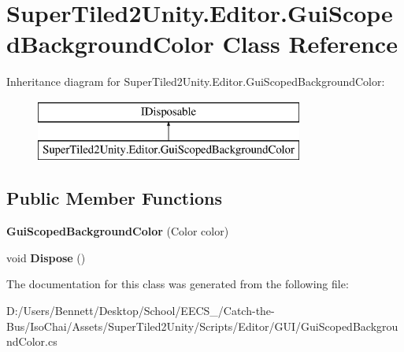 \hypertarget{class_super_tiled2_unity_1_1_editor_1_1_gui_scoped_background_color}{}\section{Super\+Tiled2\+Unity.\+Editor.\+Gui\+Scoped\+Background\+Color Class Reference}
\label{class_super_tiled2_unity_1_1_editor_1_1_gui_scoped_background_color}
Inheritance diagram for Super\+Tiled2\+Unity.\+Editor.\+Gui\+Scoped\+Background\+Color\+:\begin{figure}[H]
\begin{center}
\leavevmode
\includegraphics[height=2.000000cm]{class_super_tiled2_unity_1_1_editor_1_1_gui_scoped_background_color}
\end{center}
\end{figure}
\subsection*{Public Member Functions}
\begin{DoxyCompactItemize}
\item 
\mbox{\label{class_super_tiled2_unity_1_1_editor_1_1_gui_scoped_background_color_ae629fdef1170594b6bc5a016e02e46f0}} 
{\bfseries Gui\+Scoped\+Background\+Color} (Color color)
\item 
\mbox{\label{class_super_tiled2_unity_1_1_editor_1_1_gui_scoped_background_color_abd13eef57e5bb124b0995c5b2bae6a37}} 
void {\bfseries Dispose} ()
\end{DoxyCompactItemize}


The documentation for this class was generated from the following file\+:\begin{DoxyCompactItemize}
\item 
D\+:/\+Users/\+Bennett/\+Desktop/\+School/\+E\+E\+C\+S\+\_/\+Catch-\/the-\/\+Bus/\+Iso\+Chai/\+Assets/\+Super\+Tiled2\+Unity/\+Scripts/\+Editor/\+G\+U\+I/Gui\+Scoped\+Background\+Color.\+cs\end{DoxyCompactItemize}
